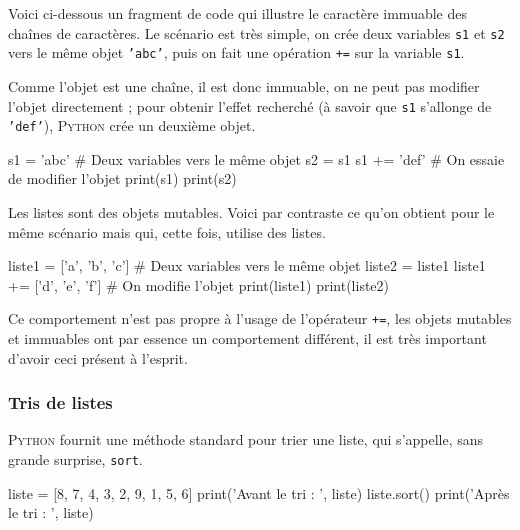 Voici ci-dessous un fragment de code qui illustre le caractère immuable des chaînes de caractères. Le scénario est très simple, on crée deux variables \texttt{s1} et \texttt{s2} vers le même objet \texttt{'abc'}, puis on fait une opération \texttt{+=} sur la variable \texttt{s1}.

Comme l'objet est une chaîne, il est donc immuable, on ne peut pas modifier l'objet directement ; pour obtenir l'effet recherché (à savoir que \texttt{s1} s'allonge de \texttt{'def'}), \textsc{Python} crée un deuxième objet.

\begin{idleconsole}
\begin{pyconsole}
s1 = 'abc' # Deux variables vers le même objet
s2 = s1
s1 += 'def' # On essaie de modifier l'objet
print(s1)
print(s2)
\end{pyconsole}
\end{idleconsole}

Les listes sont des objets mutables. Voici par contraste ce qu'on obtient pour le même scénario mais qui, cette fois, utilise des listes.

\begin{idleconsole}
\begin{pyconsole}
liste1 = ['a', 'b', 'c'] # Deux variables vers le même objet
liste2 = liste1
liste1 += ['d', 'e', 'f'] # On modifie l'objet
print(liste1)
print(liste2)
\end{pyconsole}
\end{idleconsole}

\begin{linewidthnote}
Ce comportement n'est pas propre à l'usage de l'opérateur \texttt{+=}, les objets mutables et immuables ont par essence un comportement différent, il est très important d'avoir ceci présent à l'esprit.
\end{linewidthnote}

\subsubsection[Tris de listes]{Tris de listes}
\label{subsub:XI.2.2.4}

\textsc{Python} fournit une méthode standard pour trier une liste, qui s'appelle, sans grande surprise, \texttt{sort}.

\begin{idleconsole}
\begin{pyconsole}
liste = [8, 7, 4, 3, 2, 9, 1, 5, 6]
print('Avant le tri : ', liste)
liste.sort()
print('Après le tri : ', liste)
\end{pyconsole}
\end{idleconsole}

